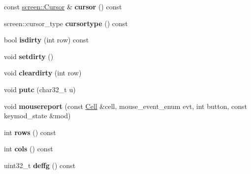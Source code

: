 \begin{DoxyCompactItemize}
\item 
\mbox{\label{classterm_1_1TermImpl_acb042185b92338e3971f86a4a340d8da}} 
const \mbox{\hyperlink{structscreen_1_1Cursor}{screen\+::\+Cursor}} \& {\bfseries cursor} () const
\item 
\mbox{\label{classterm_1_1TermImpl_aa0a4c859441b9371c5fc66dd60cfd7b9}} 
screen\+::cursor\+\_\+type {\bfseries cursortype} () const
\item 
\mbox{\label{classterm_1_1TermImpl_a31e87221963b8dd1db9cc775d29d4897}} 
bool {\bfseries isdirty} (int row) const
\item 
\mbox{\label{classterm_1_1TermImpl_aa324fe9b8c4b8acebe28900ed3b6af9e}} 
void {\bfseries setdirty} ()
\item 
\mbox{\label{classterm_1_1TermImpl_a1eb80006948ba09d49db0b5b3b6a4f9d}} 
void {\bfseries cleardirty} (int row)
\item 
\mbox{\label{classterm_1_1TermImpl_a34582e3cb94065e2722bdea7f2371e3c}} 
void {\bfseries putc} (char32\+\_\+t u)
\item 
\mbox{\label{classterm_1_1TermImpl_ad9c87266c937cfd9baaec99a727918e2}} 
void {\bfseries mousereport} (const \mbox{\hyperlink{structCell}{Cell}} \&cell, mouse\+\_\+event\+\_\+enum evt, int button, const keymod\+\_\+state \&mod)
\item 
\mbox{\label{classterm_1_1TermImpl_a897cbb0a5a7ce09bafd42fa13eb953eb}} 
int {\bfseries rows} () const
\item 
\mbox{\label{classterm_1_1TermImpl_a43576f0c380f0e5aa94fa1e4f0fbc63a}} 
int {\bfseries cols} () const
\item 
\mbox{\label{classterm_1_1TermImpl_a9d3458310ddd6bc8296910348c7294a8}} 
uint32\+\_\+t {\bfseries deffg} () const
\item 
\mbox{\label{classterm_1_1TermImpl_a5125e2130dd28044cce5754cfb6d59d1}} 

\end{DoxyCompactItemize}
